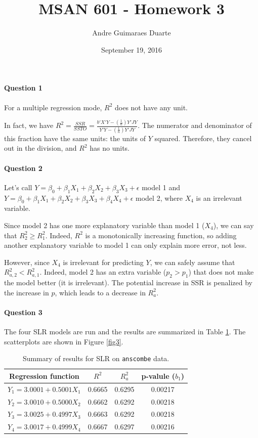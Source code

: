 \documentclass[]{article}
\title{MSAN 601 - Homework 3}
\author{Andre Guimaraes Duarte}
\date{September 19, 2016}
\let\oldparagraph\paragraph
\renewcommand{\paragraph}[1]{\oldparagraph{#1}\mbox{}}
\begin{document}
\maketitle

\paragraph{\Large Question 1}\normalsize

For a multiple regression mode, $R^2$ does not have any unit.

In fact, we have $R^2 = \frac{SSR}{SSTO} = \frac{b'X'Y - (\frac{1}{n})Y'JY}{Y'Y - (\frac{1}{n})Y'JY}$. The numerator and denominator of this fraction have the same units: the units of $Y$ squared. Therefore, they cancel out in the division, and $R^2$ has no units.

\paragraph{\Large Question 2}\normalsize

Let's call $Y = \beta_0 + \beta_1 X_1 + \beta_2 X_2 + \beta_3 X_3 + \epsilon$ model 1 and $Y = \beta_0 + \beta_1 X_1 + \beta_2 X_2 + \beta_3 X_3 + \beta_4 X_4 + \epsilon$ model 2, where $X_4$ is an irrelevant variable.

Since model 2 has one more explanatory variable than model 1 ($X_4$), we can say that $R^2_2 \geq R^2_1$. Indeed, $R^2$ is a monotonically increasing function, so adding another explanatory variable to model 1 can only explain more error, not less.

However, since $X_4$ is irrelevant for predicting $Y$, we can safely assume that $R^2_{a,2} < R^2_{a,1}$. Indeed, model 2 has an extra variable ($p_2 > p_1$) that does not make the model better (it is irrelevant). The potential increase in SSR is penalized by the increase in $p$, which leads to a decrease in $R^2_a$.

\paragraph{\Large Question 3}\normalsize

The four SLR models are run and the results are summarized in Table \ref{q3}. The scatterplots are shown in Figure \ref{fig3}.

\begin{table}[!ht]
\caption{Summary of results for SLR on \texttt{anscombe} data.}
\begin{center}
\begin{tabular}{|c|c|c|c|}
\hline
Regression function & $R^2$ & $R^2_a$ & p-valule ($b_1$) \\
\hline
$Y_1 = 3.0001 + 0.5001 X_1$ & 0.6665 & 0.6295 & 0.00217 \\
$Y_2 = 3.0010 + 0.5000 X_2$ & 0.6662 & 0.6292 & 0.00218 \\
$Y_3 = 3.0025 + 0.4997 X_3$ & 0.6663 & 0.6292 & 0.00218 \\
$Y_4 = 3.0017 + 0.4999 X_4$ & 0.6667 & 0.6297 & 0.00216 \\
\hline
\end{tabular}
\end{center}
\label{q3}
\end{table}
\end{document}
